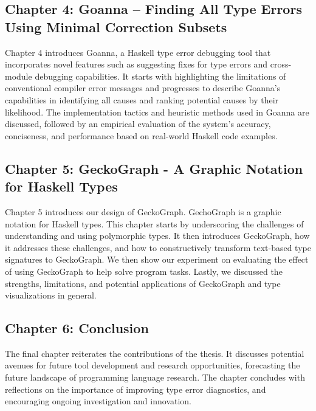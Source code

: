 \subsection*{Chapter 4: Goanna -- Finding All Type Errors Using Minimal Correction Subsets}
Chapter 4 introduces Goanna, a Haskell type error debugging tool that incorporates novel features such as suggesting fixes for type errors and cross-module debugging capabilities. It starts with highlighting the limitations of conventional compiler error messages and progresses to describe Goanna's capabilities in identifying all causes and ranking potential causes by their likelihood. The implementation tactics and heuristic methods used in Goanna are discussed, followed by an empirical evaluation of the system's accuracy, conciseness, and performance based on real-world Haskell code examples.
    
\subsection*{Chapter 5: GeckoGraph - A Graphic Notation for Haskell Types}
Chapter 5 introduces our design of GeckoGraph. GechoGraph is a graphic notation for Haskell types. This chapter starts by underscoring the challenges of understanding and using polymorphic types. It then introduces GeckoGraph, how it addresses these challenges, and how to constructively transform text-based type signatures to GeckoGraph. We then show our experiment on evaluating the effect of using GeckoGraph to help solve program tasks. Lastly, we discussed the strengths, limitations, and potential applications of GeckoGraph and type visualizations in general.   
    
\subsection*{Chapter 6: Conclusion}
The final chapter reiterates the contributions of the thesis. It discusses potential avenues for future tool development and research opportunities, forecasting the future landscape of programming language research. The chapter concludes with reflections on the importance of improving type error diagnostics, and encouraging ongoing investigation and innovation.